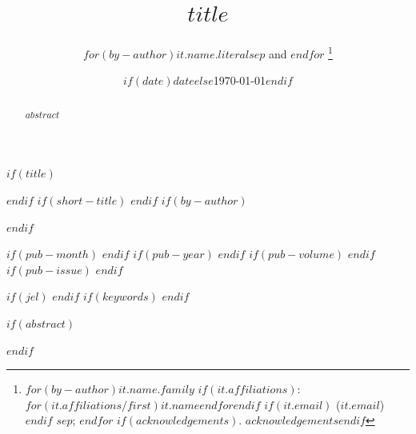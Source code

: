 $if(title)$
\title{$title$}
$endif$
$if(short-title)$
$endif$
$if(by-author)$
\author{$for(by-author)$$it.name.literal$$sep$ and $endfor$%
\thanks{$for(by-author)$$it.name.family$%
$if(it.affiliations)$: $for(it.affiliations/first)$$it.name$$endfor$$endif$%
$if(it.email)$ ($it.email$)$endif$%
$sep$; $endfor$%
$if(acknowledgements)$. $acknowledgements$$endif$}}
$endif$
\date{$if(date)$$date$$else$\today$endif$}
$if(pub-month)$
$endif$
$if(pub-year)$
$endif$
$if(pub-volume)$
$endif$
$if(pub-issue)$
$endif$

$if(jel)$
$endif$
$if(keywords)$
$endif$

$if(abstract)$
\begin{abstract}
$abstract$
\end{abstract}
$endif$

\maketitle
